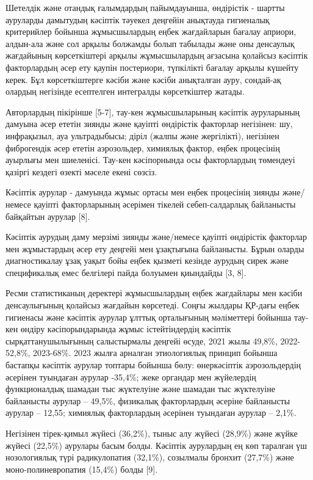 Шетелдік және отандық ғалымдардың пайымдауынша, өндірістік - шартты
ауруларды дамытудың кәсіптік тәуекел деңгейін анықтауда гигиеналық
критерийлер бойынша жұмысшылардың еңбек жағдайларын бағалау априори,
алдын-ала және сол арқылы болжамды болып табылады және оны денсаулық
жағдайының көрсеткіштері арқылы жұмысшылардың ағзасына қолайсыз кәсіптік
факторлардың әсер ету қаупін постериори, түпкілікті бағалау арқылы
күшейту керек. Бұл көрсеткіштерге кәсіби және кәсіби анықталған ауру,
сондай-ақ олардың негізінде есептелген интегралды көрсеткіштер жатады.

Авторлардың пікірінше {[}5-7{]}, тау-кен жұмысшыларының кәсіптік
ауруларының дамуына әсер ететін зиянды және қауіпті өндірістік факторлар
негізінен: шу, инфрақызыл, ауа ультрадыбысы; діріл (жалпы және
жергілікті), негізінен фиброгендік әсер ететін аэрозольдер, химиялық
фактор, еңбек процесінің ауырлығы мен шиеленісі. Тау-кен кәсіпорнында
осы факторлардың төмендеуі қазіргі кездегі өзекті мәселе екені сөзсіз.

Кәсіптік аурулар - дамуында жұмыс ортасы мен еңбек процесінің зиянды
және/немесе қауіпті факторларының әсерімен тікелей себеп-салдарлық
байланысты байқайтын аурулар {[}8{]}.

Кәсіптік аурудың даму мерзімі зиянды және/немесе қауіпті өндірістік
факторлар мен жұмыстардың әсер ету деңгейі мен ұзақтығына байланысты.
Бұрын оларды диагностикалау ұзақ уақыт бойы еңбек қызметі кезінде
аурудың сирек және спецификалық емес белгілері пайда болуымен қиындайды
{[}3, 8{]}.

Ресми статистиканың деректері жұмысшылардың еңбек жағдайлары мен кәсіби
денсаулығының қолайсыз жағдайын көрсетеді. Соңғы жылдары ҚР-дағы еңбек
гигиенасы және кәсіптік аурулар ұлттық орталығының мәліметтері бойынша
тау-кен өндіру кәсіпорындарында жұмыс істейтіндердің кәсіптік
сырқаттанушылығының салыстырмалы деңгейі өсуде, 2021 жылы 49,8\%,
2022-52,8\%, 2023-68\%. 2023 жылға арналған этиологиялық принцип бойынша
бастапқы кәсіптік аурулар топтары бойынша бөлу: өнеркәсіптік
аэрозольдердің әсерінен туындаған аурулар -35,4\%; жеке органдар мен
жүйелердің функционалдық шамадан тыс жүктелуіне және шамадан тыс
жүктелуіне байланысты аурулар -- 49,5\%, физикалық факторлардың әсеріне
байланысты аурулар -- 12,55; химиялық факторлардың әсерінен туындаған
аурулар -- 2,1\%.

Негізінен тірек-қимыл жүйесі (36,2\%), тыныс алу жүйесі (28,9\%) және
жүйке жүйесі (22,5\%) аурулары басым болды. Кәсіптік аурулардың ең көп
таралған үш нозологиялық түрі радикулопатия (32,1\%), созылмалы бронхит
(27,7\%) және моно-полиневропатия (15,4\%) болды {[}9{]}.

